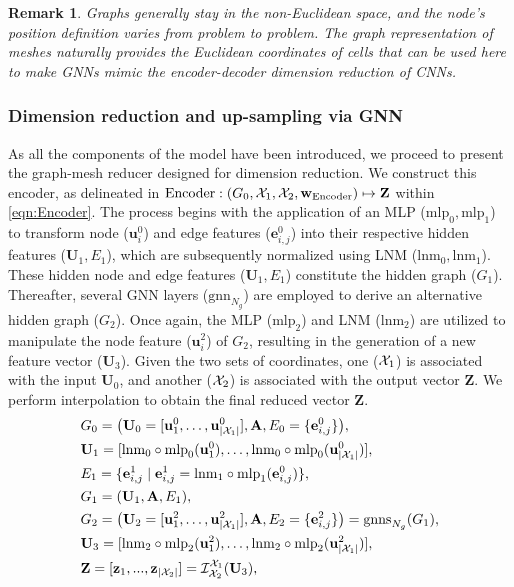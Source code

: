 \documentclass{article}
\newtheorem{remark}{Remark}
\begin{document}
\begin{remark}
Graphs generally stay in the non-Euclidean space, and the node's position definition varies from problem to problem. The graph representation of meshes naturally provides the Euclidean coordinates of cells that can be used here to make GNNs mimic the encoder-decoder dimension reduction of CNNs.
\end{remark}

\subsubsection{Dimension reduction and up-sampling via GNN}
\label{sec:dimreduc}
As all the components of the model have been introduced, we proceed to present the graph-mesh reducer designed for dimension reduction. We construct this encoder, as delineated in $\mathrm{Encoder}:(G_0,\mathcal{X}_1,\mathcal{X}_2,\mathbf{w}_{\mathrm{Encoder}})\mapsto \mathbf{Z}$ within \eqref{eqn:Encoder}. The process begins with the application of an MLP ($\mathrm{mlp}_0, \mathrm{mlp}_1$) to transform node ($\mathbf{u}^0_i$) and edge features ($\mathbf{e}^0_{i,j}$) into their respective hidden features ($\mathbf{U}_1,E_1$), which are subsequently normalized using LNM ($\mathrm{lnm}_0, \mathrm{lnm}_1$). These hidden node and edge features ($\mathbf{U}_1,E_1$) constitute the hidden graph ($G_1$). Thereafter, several GNN layers ($\mathrm{gnn}_{N_g}$) are employed to derive an alternative hidden graph ($G_2$). Once again, the MLP ($\mathrm{mlp}_2$) and LNM ($\mathrm{lnm}_2$) are utilized to manipulate the node feature ($\mathbf{u}_i^2$) of $G_2$, resulting in the generation of a new feature vector ($\mathbf{U}_3$). Given the two sets of coordinates, one ($\mathcal{X}_1$) is associated with the input $\mathbf{U}_0$, and another ($\mathcal{X}_2$) is associated with the output vector $\mathbf{Z}$. We perform interpolation to obtain the final reduced vector $\mathbf{Z}$.
\begin{equation}
        \begin{split}
        &G_0 = \big(\mathbf{U}_0=[\mathbf{u}_1^0,\dots,\mathbf{u}_{|\mathcal{X}_1|}^0],\mathbf{A},E_0=\{\mathbf{e}^0_{i,j}\}  \big),\\
            &\mathbf{U}_1=[\mathrm{lnm}_0\circ\mathrm{mlp}_0(\mathbf{u}^0_1),\dots,\mathrm{lnm}_0\circ\mathrm{mlp}_0(\mathbf{u}_{|\mathcal{X}_1|}^0)],\\
            &E_1=\{\mathbf{e}_{i,j}^1\;|\; \mathbf{e}_{i,j}^1=\mathrm{lnm}_1\circ\mathrm{mlp}_1(\mathbf{e}^0_{i,j})           \},\\
            &G_1 = (\mathbf{U}_1,\mathbf{A},E_1),\\
            &G_2 = \big(\mathbf{U}_2=[\mathbf{u}_1^2,\dots,\mathbf{u}_{|\mathcal{X}_1|}^2],\mathbf{A},E_2=\{\mathbf{e}^2_{i,j}\}  \big) = \mathrm{gnns}_{N_g}(G_1),\\
            &\mathbf{U}_3=[\mathrm{lnm}_2\circ\mathrm{mlp}_2(\mathbf{u}^2_1),\dots,\mathrm{lnm}_2\circ\mathrm{mlp}_2(\mathbf{u}_{|\mathcal{X}_1|}^2)],\\
            &\mathbf{Z}=[\mathbf{z}_1,...,\mathbf{z}_{|\mathcal{X}_2|}]=\mathcal{I}^{\mathcal{X}_1}_{\mathcal{X}_2}(\mathbf{U}_3),
        \end{split}
        \label{eqn:Encoder}
\end{equation}
\end{document}
